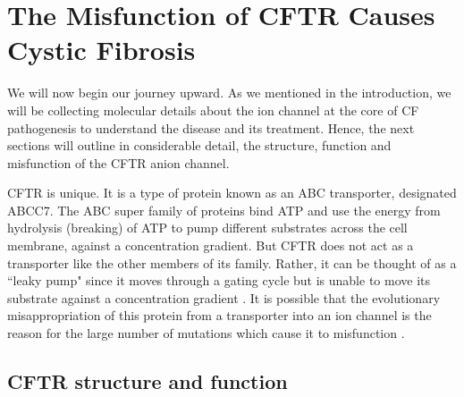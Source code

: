 \section{The Misfunction of CFTR Causes Cystic Fibrosis}

We will now begin our journey upward. As we mentioned in the introduction, we will be collecting molecular details about the ion channel at the core of CF pathogenesis to understand the disease and its treatment. Hence, the next sections will outline in considerable detail, the structure, function and misfunction of the CFTR anion channel. 

CFTR is unique. It is a type of protein known as an ABC transporter, designated ABCC7. The ABC super family of proteins bind ATP and use the energy from hydrolysis (breaking) of ATP to pump different substrates across the cell membrane, against a concentration gradient. But CFTR does not act as a transporter like the other members of its family. Rather, it can be thought of as a ``leaky pump" since it moves through  a gating cycle but is unable to move its substrate against a concentration gradient \cite{gadsby2006,linsdell2018}. It is possible that the evolutionary misappropriation of this protein from a transporter into an ion channel is the reason for the large number of mutations which cause it to misfunction \cite{infield2021}. 


\subsection{CFTR structure and function}

